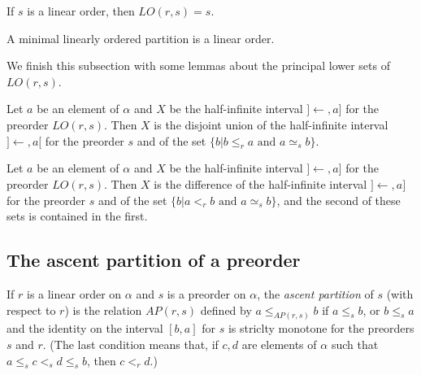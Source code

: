 \begin{sublemma}
If $s$ is a linear order, then $LO(r,s)=s$.

\end{sublemma}

\begin{sublemma}
A minimal linearly ordered partition is a linear order.

\end{sublemma}

We finish this subsection with some lemmas about the principal lower sets of $LO(r,s)$.

\begin{sublemma}
Let $a$ be an element of $\alpha$ and $X$ be the half-infinite interval $]\leftarrow,a]$ for the preorder $LO(r,s)$. Then
$X$ is the disjoint union of the half-infinite interval $]\leftarrow,a[$ for the preorder $s$ and of the set
$\{b| b\le_r a\mbox{ and }a\simeq_s b\}$.

\end{sublemma}

\begin{sublemma}
Let $a$ be an element of $\alpha$ and $X$ be the half-infinite interval $]\leftarrow,a]$ for the preorder $LO(r,s)$. Then
$X$ is the difference of the half-infinite interval $]\leftarrow,a]$ for the preorder $s$ and of the set
$\{b| a<_r b\mbox{ and }a\simeq_s b\}$, and the second of these sets is contained in the first.

\end{sublemma}


\subsection{The ascent partition of a preorder}

\begin{subdefi}
If $r$ is a linear order on $\alpha$ and $s$ is a preorder on $\alpha$, the \emph{ascent partition} of $s$ (with respect to $r$)
is the relation $AP(r,s)$ defined by $a\le_{AP(r,s)}b$ if $a\le_s b$, or $b\le_s a$ and the identity on the interval $[b,a]$ for $s$
is striclty monotone for the preorders $s$ and $r$.
(The last condition means that, if $c,d$ are elements of $\alpha$ such that $a\le_s c <_s d \le_s b$, then $c<_r d$.)

\end{subdefi}


